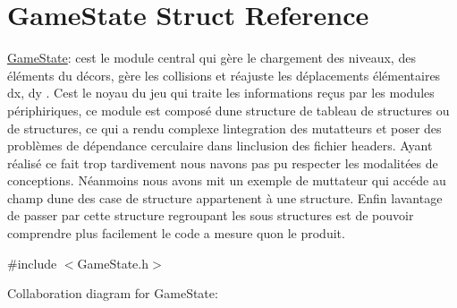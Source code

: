 \hypertarget{struct_game_state}{}\section{Game\+State Struct Reference}
\label{struct_game_state}


\hyperlink{struct_game_state}{Game\+State}\+: c\textquotesingle{}est le module central qui gère le chargement des niveaux, des éléments du décors, gère les collisions et réajuste les déplacements élémentaires dx, dy . C\textquotesingle{}est le noyau du jeu qui traite les informations reçus par les modules périphiriques, ce module est composé d\textquotesingle{}une structure de tableau de structures ou de structures, ce qui a rendu complexe l\textquotesingle{}integration des mutatteurs et poser des problèmes de dépendance cerculaire dans l\textquotesingle{}inclusion des fichier headers. Ayant réalisé ce fait trop tardivement nous n\textquotesingle{}avons pas pu respecter les modalitées de conceptions. Néanmoins nous avons mit un exemple de muttateur qui accéde au champ d\textquotesingle{}une des case de structure appartenent à une structure. Enfin l\textquotesingle{}avantage de passer par cette structure regroupant les sous structures est de pouvoir comprendre plus facilement le code a mesure qu\textquotesingle{}on le produit.  




{\ttfamily \#include $<$Game\+State.\+h$>$}



Collaboration diagram for Game\+State\+:
